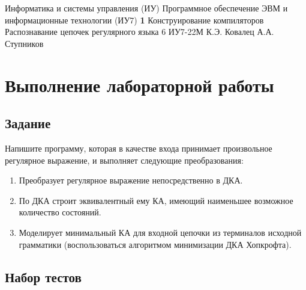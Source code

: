 \documentclass{bmstu}
\begin{document}
\makereporttitle
{Информатика и системы управления (ИУ)}
{Программное обеспечение ЭВМ и информационные технологии (ИУ7)}
{\textbf{1}}
{Конструирование компиляторов}
{Распознавание цепочек регулярного языка}
{6}
{ИУ7-22М}
{К.Э. Ковалец}
{А.А. Ступников}


\setcounter{page}{2}


\chapter{Выполнение лабораторной работы}

\section{Задание}

Напишите программу, которая в качестве входа принимает произвольное регулярное выражение, и выполняет
следующие преобразования:
\begin{enumerate}
    \item Преобразует регулярное выражение непосредственно в ДКА.
    \item По ДКА строит эквивалентный ему КА, имеющий наименьшее возможное количество состояний.
    \item Моделирует минимальный КА для входной цепочки из терминалов исходной грамматики (воспользоваться алгоритмом минимизации ДКА Хопкрофта).
\end{enumerate}

\section{Набор тестов}
\end{document}
